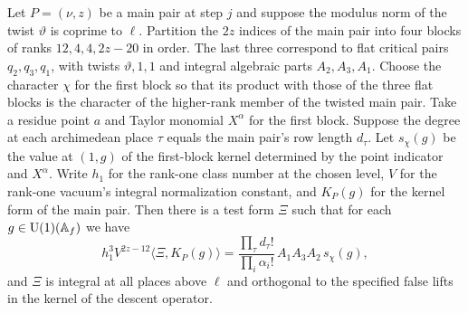\begin{lemma}
\label{lem:c-test-seesaw-factorization}
\emitthmsource
Let $P=(\nu,z)$ be a main pair at step $j$ and suppose the modulus norm of the twist $\vartheta$ is coprime to $\ell$. Partition the $2z$ indices of the main pair into four blocks of ranks $12,4,4,2z-20$ in order. The last three correspond to flat critical pairs $q_2,q_3,q_1$, with twists $\vartheta,1,1$ and integral algebraic parts $A_2,A_3,A_1$. Choose the character $\chi$ for the first block so that its product with those of the three flat blocks is the character of the higher-rank member of the twisted main pair. Take a residue point $a$ and Taylor monomial $X^\alpha$ for the first block. Suppose the degree at each archimedean place $\tau$ equals the main pair's row length $d_\tau$. Let $s_\chi(g)$ be the value at $(1,g)$ of the first-block kernel determined by the point indicator and $X^\alpha$. Write $h_1$ for the rank-one class number at the chosen level, $V$ for the rank-one vacuum's integral normalization constant, and $K_P(g)$ for the kernel form of the main pair. Then there is a test form $\Xi$ such that for each $g\in \operatorname{U}(1)(\mathbb A_f)$ we have
\[
 h_1^3 V^{2z-12}\langle\Xi,K_P(g)\rangle
  =\frac{\prod_\tau d_\tau!}{\prod_i\alpha_i!}\, A_1 A_3 A_2\,s_\chi(g),
\]
and $\Xi$ is integral at all places above $\ell$ and orthogonal to the specified false lifts in the kernel of the descent operator.
\end{lemma}
